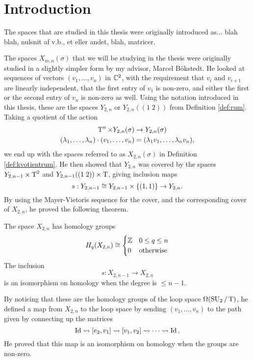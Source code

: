 \chapter{Introduction}


The spaces that are studied in this thesis were originally introduced
as... blah blah, nulsnit af v.b., et eller andet, blah, matricer.


The spaces $X_{m,n}(\sigma)$ that we will be studying in the thesis
were originally studied in a slightly simpler form by my advisor,
Marcel B\"okstedt. He looked at sequences of vectors $(v_1,\dots,v_n)$
in $\mathbb{C}^2$, with the requirement that $v_i$ and $v_{i+1}$ are linearly
independent, that the first entry of $v_1$  is non-zero, and either
the first or the second entry of $v_n$ is non-zero as well. Using the
notation introduced in this thesis, these are the spaces $Y_{2,n}$ or
$Y_{2,n}((1\;2))$ from Definition \ref{def:rum}. Taking a quotient
of the action
\begin{align*}
  \operatorname{T}^n \times Y_{2,n}(\sigma) &\to Y_{2,n}(\sigma) \\
  (\lambda_1,\dots,\lambda_n)\cdot (v_1,\dots,v_n) &= (\lambda_1v_1,\dots,\lambda_nv_n),
\end{align*}
we end up with the spaces referred to as $X_{2,n}(\sigma)$ in
Definition \ref{def:kvotientrum}. He then showed that $Y_{2,n}$ was
covered by the spaces $Y_{2,n-1}\times\operatorname{T}^2$ and $Y_{2,n-1}((1\; 2))\times
\operatorname{T}$, giving inclusion maps
\[ s : Y_{2,n-1} \cong Y_{2,n-1}\times\left\{ (1,1) \right\} \to Y_{2,n}. \]
By using the Mayer-Vietoris sequence for the cover, and the
corresponding cover of $X_{2,n}$, he proved the
following theorem.
\begin{theorem}
  The space $X_{2,n}$ has homology groups
  \[ H_q(X_{2,n}) \cong
  \begin{cases}
    \mathbb{Z} & 0 \leq q \leq n \\
    0 & \text{otherwise}
  \end{cases} \]
  The inclusion
  \[ s : X_{2,n-1} \to X_{2,n} \]
  is an isomorphism on homology when the degree is $\leq n-1$.
\end{theorem}

By noticing that these are the homology groups of the loop space
$\Omega(\operatorname{SU}_2/\operatorname{T})$, he defined a map from $X_{2,n}$ to the loop space
by sending $(v_1,\dots,v_n)$ to
the path given by connecting up the matrices
\[ \operatorname{Id} \leadsto [e_2,v_1] \leadsto [v_1,v_2] \leadsto \dots \leadsto
\operatorname{Id}. \]
He proved that this map is an isomorphism on homology when the
groups are non-zero.

